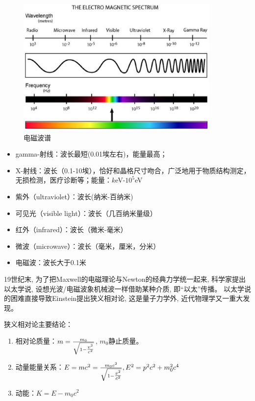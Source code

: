 \begin{figure}[h]
\begin{center}
\includegraphics[width=10cm]{Duality/em-spectrum.ps}
\caption{电磁波谱}
\end{center}
\end{figure}


\begin{itemize}
  \item gamma-射线：波长最短(0.01埃左右)，能量最高；
  \item X-射线：波长（0.1-10埃），恰好和晶格尺寸吻合，广泛地用于物质结构测定，无损检测，医疗诊断等；能量：$k$eV-$10^5$eV
  \item 紫外（ultraviolet）：波长(纳米-百纳米)
  \item 可见光（visible light）：波长（几百纳米量级）
  \item 红外（infrared）：波长（微米-毫米）
  \item 微波（microwave）：波长（毫米，厘米，分米）
  \item 电磁波：波长大于0.1米
\end{itemize}


19世纪末, 为了把Maxwell的电磁理论与Newton的经典力学统一起来,
科学家提出以太学说, 设想光波/电磁波象机械波一样借助某种介质,
即``以太''传播。 以太学说的困难直接导致Einstein提出狭义相对论,
这是量子力学外, 近代物理学又一重大发现。

狭义相对论主要结论：


\begin{enumerate}
    \item 相对论质量：$m = \frac{{m_0 }}{{\sqrt {1 - {\textstyle{{v^2 } \over {c^2 }}}} }}$, $m_0$静止质量。
    \item 动量能量关系：$E = mc^2  = \frac{{m_0 c^2 }}{{\sqrt {1 - {\textstyle{{v^2 } \over {c^2 }}}} }},E^2  = p^2 c^2  + m_0 ^2 c^4 $
    \item 动能：$K = E - m_0 c^2$
\end{enumerate}

